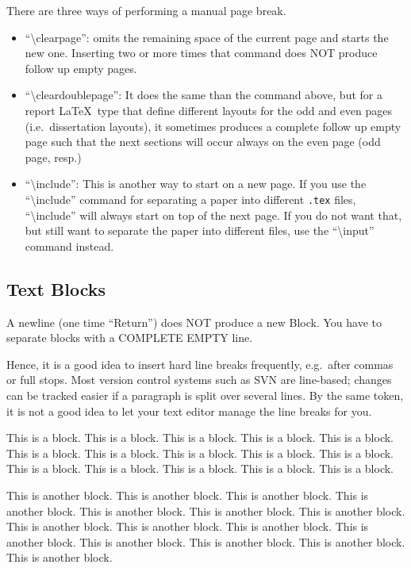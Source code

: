 \documentclass[numbered]{ivt-style/standard}\usepackage[]{graphicx}\usepackage[]{xcolor}
\begin{document}
There are three ways of performing a manual page break.
\begin{itemize}
  \item ``\textbackslash{}clearpage'': omits the remaining space of the
current page and starts the new one. Inserting two or more times that
command does NOT produce follow up empty pages.
  \item ``\textbackslash{}cleardoublepage'': It does the same than the
command above, but for a report \LaTeX\ type that define different
layouts for the odd and even pages (i.e.\ dissertation layouts), it
sometimes produces a complete follow up empty page such that the next
sections will occur always on the even page (odd page, resp.)
  \item ``\textbackslash{}include'': This is another way to start on a
new page. If you use the ``\textbackslash{}include''
command for separating a paper
into different \texttt{.tex} files,
``\textbackslash{}include'' will always start on
top of the next page. If you do not want that, but still want to
separate the paper into different files,
use the ``\textbackslash{}input''
command instead.
\end{itemize}

\clearpage

\cleardoublepage

\subsection{Text Blocks}

A newline (one time ``Return'') does NOT produce a new Block.
You have to separate blocks with a COMPLETE EMPTY line.

Hence, it is a good idea to insert hard line breaks frequently,
e.g.~after commas or full stops.
Most version control systems such as SVN are line-based;
changes can be tracked easier if a paragraph is split
over several lines.
By the same token, it is not a good idea to let your text editor
manage the line breaks for you.

This is a block. This is a block. This is a block. This is a block.
This is a block. This is a block. This is a block. This is a block.
This is a block. This is a block. This is a block. This is a block.
This is a block. This is a block. This is a block.

This is another block. This is another block. This is another block.
This is another block. This is another block. This is another block.
This is another block. This is another block. This is another block.
This is another block. This is another block. This is another block.
This is another block. This is another block. This is another block.
\end{document}
